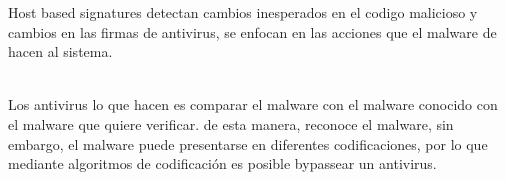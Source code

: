 \documentclass[10pt,a4paper]{article} %
\begin{document}
        Host based signatures detectan cambios inesperados en el codigo
        malicioso y cambios en las firmas de antivirus, se enfocan en las
        acciones que el malware de hacen al sistema. 
        
        \\ Los antivirus lo que hacen es comparar el malware con el malware
        conocido con el malware que quiere verificar. de esta manera, reconoce
        el malware, sin embargo, el malware puede presentarse en diferentes
        codificaciones, por lo que mediante algoritmos de codificación es
        posible bypassear un antivirus.
        
    







    
    \nocite{*}
    
    
\end{document}
